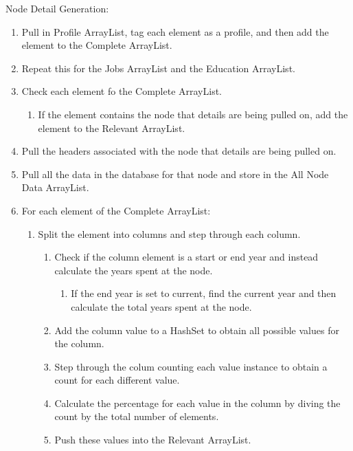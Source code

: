 \begin{description}
    \item[Node Detail Generation:]
\end{description}
\begin{enumerate}
  \item Pull in Profile ArrayList, tag each element as a profile, and then add
  the element to the Complete ArrayList.
  \item Repeat this for the Jobs ArrayList and the Education ArrayList.
  \item Check each element fo the Complete ArrayList.
  \begin{enumerate}
    \item If the element contains the node that details are being pulled on, add
    the element to the Relevant ArrayList.
  \end{enumerate}
  \item Pull the headers associated with the node that details are being pulled
  on.
  \item Pull all the data in the database for that node and store in the All
  Node Data ArrayList.
  \item For each element of the Complete ArrayList:
  \begin{enumerate}
    \item Split the element into columns and step through each column.
    \begin{enumerate}
    	\item Check if the column element is a start or end year and instead
    	calculate the years spent at the node.
    	\begin{enumerate}
    	  \item If the end year is set to current, find the current year and then
    	  calculate the total years spent at the node.
    	\end{enumerate}
    	\item Add the column value to a HashSet to obtain all possible values for
    	the column.
    	\item Step through the colum counting each value instance to obtain a count
    	for each different value.
    	\item Calculate the percentage for each value in the column by diving the
    	count by the total number of elements.
    	\item Push these values into the Relevant ArrayList.
    \end{enumerate} 
  \end{enumerate}

\end{enumerate}
